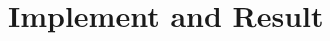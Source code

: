 \documentclass[12pt]{report}
\begin{document}
	
	\chapter{Implement and Result}
%	
	
	
	
%
%	
\end{document}
